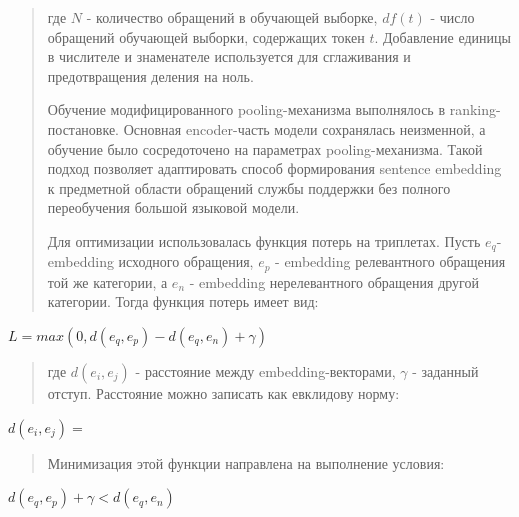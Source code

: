 \begin{quote}
где \(N\) - количество обращений в обучающей выборке, \(df(t)\) - число
обращений обучающей выборки, содержащих токен \(t\). Добавление единицы
в числителе и знаменателе используется для сглаживания и предотвращения
деления на ноль.

Обучение модифицированного pooling-механизма выполнялось в
ranking-постановке. Основная encoder-часть модели сохранялась
неизменной, а обучение было сосредоточено на параметрах
pooling-механизма. Такой подход позволяет адаптировать способ
формирования sentence embedding к предметной области обращений службы
поддержки без полного переобучения большой языковой модели.

Для оптимизации использовалась функция потерь на триплетах. Пусть
\(e_{q}\)- embedding исходного обращения, \(e_{p}\) - embedding
релевантного обращения той же категории, а \(e_{n}\) - embedding
нерелевантного обращения другой категории. Тогда функция потерь имеет
вид:
\end{quote}

\(L = max\left( 0,d\left( e_{q},e_{p} \right) - d\left( e_{q},e_{n} \right) + \gamma \right)\)

\begin{quote}
где \(d\left( e_{i},e_{j} \right)\) - расстояние между
embedding-векторами, \(\gamma\) - заданный отступ. Расстояние можно
записать как евклидову норму:
\end{quote}

\(d\left( e_{i},e_{j} \right) =\)

\begin{quote}
Минимизация этой функции направлена на выполнение условия:
\end{quote}

\(d\left( e_{q},e_{p} \right) + \gamma < d\left( e_{q},e_{n} \right)\)

